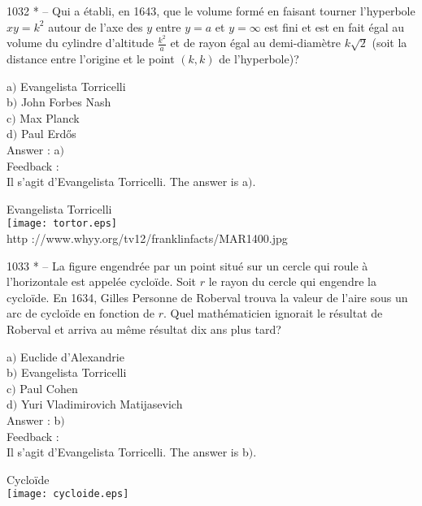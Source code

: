 ﻿\documentclass[letterpaper, 12pt]{article}
\begin{document}
1032 * -- Qui a \'etabli, en 1643, que le volume form\'e en faisant
tourner l'hyperbole $xy=k^2$ autour de l'axe des $y$ entre $y=a$ et
$y=\infty$ est fini et est en fait \'egal au volume du cylindre
d'altitude $\frac{k^2}a$ et de rayon \'egal au demi-diam\`etre
$k\sqrt2$ (soit la distance entre l'origine et le point $(k,k)$ de
l'hyperbole)?

a$)$ Evangelista Torricelli \\
b$)$ John Forbes Nash \\
c$)$ Max Planck \\
d$)$ Paul Erd\H{o}s  \\

Answer : a$)$\\

Feedback : \\
Il s'agit d'Evangelista Torricelli. The answer is a$)$.\\

        \begin{center}
        Evangelista Torricelli\\
    \texttt{[image: tortor.eps]}\\
        {\footnotesize http ://www.whyy.org/tv12/franklinfacts/MAR1400.jpg}
    \end{center}

1033 * -- La figure engendr\'ee par un point situ\'e sur un cercle
qui roule \`a l'horizontale est appel\'ee cyclo\"ide. Soit $r$ le
rayon du cercle qui engendre la cyclo\"ide. En 1634, Gilles Personne
de Roberval trouva la valeur de l'aire sous un arc de cyclo\"ide en
fonction de $r$. Quel math\'ematicien ignorait le r\'esultat de
Roberval et arriva au m\^eme r\'esultat dix ans plus tard?

a$)$ Euclide d'Alexandrie \\
b$)$ Evangelista Torricelli \\
c$)$ Paul Cohen \\
d$)$ Yuri Vladimirovich Matijasevich\\

Answer : b$)$\\

Feedback : \\
Il s'agit d'Evangelista Torricelli. The answer is b$)$.\\

        \begin{center}
Cyclo\"ide\\
    \texttt{[image: cycloide.eps]}\\
    \end{center}
\end{document}
